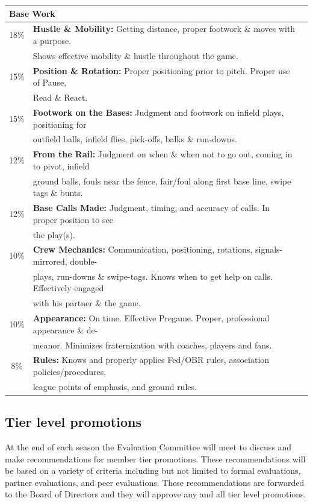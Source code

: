 \documentclass[letterpaper,11pt,colorlinks=true,allcolors=blue]{article}
\begin{document}
\begin{tabular}{c l l}
\multicolumn{2}{l}{\textbf{Base Work}} \\
\hline
18\% & \textbf{Hustle \& Mobility:} Getting distance, proper footwork \& moves with a purpose. \\
& Shows effective mobility \& hustle throughout the game. \\
15\% & \textbf{Position \& Rotation:} Proper positioning prior to pitch. Proper use of Pause, \\
& Read \& React. \\
15\% & \textbf{Footwork on the Bases:} Judgment and footwork on infield plays, positioning for \\
& outfield balls, infield flies, pick-offs, balks \& run-downs. \\
12\% & \textbf{From the Rail:} Judgment on when \& when not to go out, coming in to pivot, infield \\
& ground balls, fouls near the fence, fair/foul along first base line, swipe tags \& bunts. \\
12\% & \textbf{Base Calls Made:} Judgment, timing, and accuracy of calls. In proper position to see \\
& the play(s). \\
10\% & \textbf{Crew Mechanics:} Communication, positioning, rotations, signals-mirrored, double- \\
& plays, run-downs \& swipe-tags. Knows when to get help on calls. Effectively engaged \\
& with his partner \& the game. \\
10\% & \textbf{Appearance:} On time. Effective Pregame. Proper, professional appearance \& de- \\
& meanor. Minimizes fraternization with coaches, players and fans. \\
 8\% & \textbf{Rules:} Knows and properly applies Fed/OBR rules, association policies/procedures, \\
& league points of emphasis, and ground rules. \\
\hline
\end{tabular}

\subsection*{Tier level promotions}

At the end of each season the Evaluation Committee will meet to discuss and make recommendations for member tier promotions. These recommendations will be based on a variety of criteria including but not limited to formal evaluations, partner evaluations, and peer evaluations. These recommendations are forwarded to the Board of Directors and they will approve any and all tier level promotions.
\end{document}
